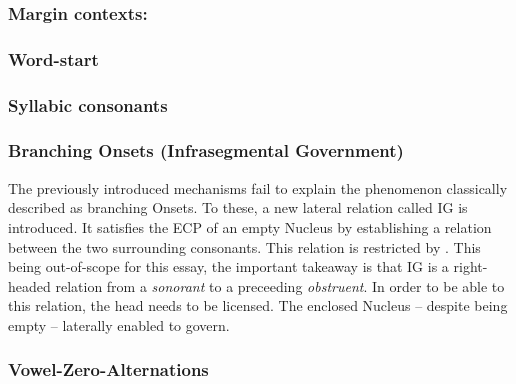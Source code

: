 \subsubsection{Margin contexts:}
\subsubsection{Word-start \ctx{\#\_}}\label{intro:obj:word start}
\begin{structure}{}
  \wordstart

\end{structure}
\TODO{}

\subsubsection{Syllabic consonants}
\TODO{}

\subsubsection{Branching Onsets (Infrasegmental Government)}
The previously introduced mechanisms fail to explain the phenomenon classically described
as branching Onsets. To  these, a new lateral relation called
\gls{IG} is introduced. It satisfies the
\gls{ECP}
of an empty Nucleus by establishing a relation between the two surrounding consonants.
This relation is restricted by .
This being out-of-scope for this essay, the important takeaway is that
\gls{IG} is a right-headed relation from a \emph{sonorant} to a preceeding \emph{obstruent}.
In order to be able to  this relation, the head needs to be licensed.
The enclosed Nucleus -- despite being empty --  laterally enabled to govern.



\subsubsection{Vowel-Zero-Alternations}
\TODO{}

